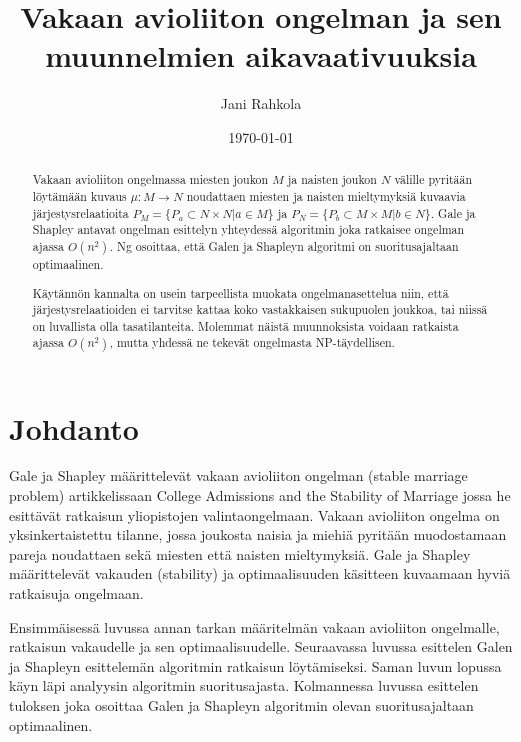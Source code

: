 \documentclass[gradu, twoside]{tktltiki}
\begin{document}
\title{Vakaan avioliiton ongelman ja sen muunnelmien aikavaativuuksia}
\author{Jani Rahkola}
\date{\today}
\level{}

\maketitle

\doublespacing

\subject{Tietojenkäsittelytiede}

\begin{abstract}
Vakaan avioliiton ongelmassa miesten joukon $M$ ja naisten joukon $N$
välille pyritään löytämään kuvaus $\mu : M \rightarrow N$ noudattaen
miesten ja naisten mieltymyksiä kuvaavia järjestysrelaatioita $P_M =
\{P_a \subset N \times N | a \in M\}$ ja $P_N = \{P_b \subset M \times
M | b \in N\}$. Gale ja Shapley antavat ongelman esittelyn yhteydessä
algoritmin joka ratkaisee ongelman ajassa $O(n^2)$. Ng osoittaa, että
Galen ja Shapleyn algoritmi on suoritusajaltaan optimaalinen.

Käytännön kannalta on usein tarpeellista muokata ongelmanasettelua
niin, että järjestysrelaatioiden ei tarvitse kattaa koko vastakkaisen
sukupuolen joukkoa, tai niissä on luvallista olla tasatilanteita.
Molemmat näistä muunnoksista voidaan ratkaista ajassa $O(n^2)$, mutta
yhdessä ne tekevät ongelmasta NP-täydellisen.
\end{abstract}

\mytableofcontents

\section{Johdanto}

Gale ja Shapley määrittelevät vakaan avioliiton ongelman (stable
marriage problem) artikkelissaan College Admissions and the Stability
of Marriage \cite{galeshapley62} jossa he esittävät ratkaisun
yliopistojen valintaongelmaan. Vakaan avioliiton ongelma on
yksinkertaistettu tilanne, jossa joukosta naisia ja miehiä pyritään
muodostamaan pareja noudattaen sekä miesten että naisten mieltymyksiä.
Gale ja Shapley määrittelevät vakauden (stability) ja optimaalisuuden
käsitteen kuvaamaan hyviä ratkaisuja ongelmaan.

Ensimmäisessä luvussa annan tarkan määritelmän vakaan avioliiton
ongelmalle, ratkaisun vakaudelle ja sen optimaalisuudelle. Seuraavassa
luvussa esittelen Galen ja Shapleyn esittelemän algoritmin ratkaisun
löytämiseksi. Saman luvun lopussa käyn läpi analyysin algoritmin
suoritusajasta. Kolmannessa luvussa esittelen tuloksen joka osoittaa
Galen ja Shapleyn algoritmin olevan suoritusajaltaan optimaalinen.
\end{document}
